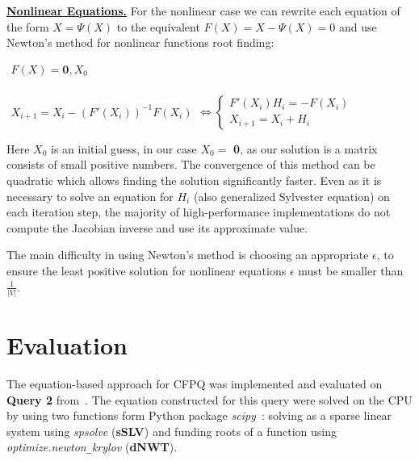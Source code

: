 \documentclass[sigconf]{acmart}
\begin{document}
\underline{\textbf{Nonlinear Equations.}}
For the nonlinear case we can rewrite each equation of the form $X = \Psi(X)$ to the equivalent $F(X) = X - \Psi(X) = 0$ and use Newton's method for nonlinear functions root finding:

\begin{center}
\(
\left.
\begin{array}{c}
F(X) = \mathbf{0}, X_0 \\
\end{array} 
\right.
\)

\(
\left. 
\begin{array}{l}
X_{i+1} = X_i - (F'(X_i))^{-1}F(X_i) 
\end{array} 
\right.
\iff 
\left\{
\begin{array}{l}
F'(X_i)H_i = - F(X_i) \\
X_{i+1} = X_i + H_i
\end{array} 
\right.
\)
\end{center}

Here $X_0$ is an initial guess, in our case $X_0 = $ \textbf{0}, as our solution is a matrix consists of small positive numbers. 
The convergence of this method can be quadratic which allows finding the solution significantly faster.
Even as it is necessary to solve an equation for $H_i$ (also generalized Sylvester equation) on each iteration step, the majority of high-performance implementations do not compute the Jacobian inverse and use its approximate value.

The main difficulty in using Newton's method is choosing an appropriate $\epsilon$, to ensure the least positive solution for nonlinear equations $\epsilon$ must be smaller than $\frac{1}{|V|}$.


\section{Evaluation}

The equation-based approach for CFPQ was implemented and evaluated on \textbf{Query 2} from~\cite{azimov2018context}.
The equation constructed for this query were solved on the CPU by using two functions form Python package \textit{scipy}~\cite{scipy}: 
solving as a sparse linear system using \textit{spsolve} (\textbf{sSLV})
and
funding roots of a function using \textit{optimize.newton\texttt{\_}krylov} (\textbf{dNWT}).
\end{document}
